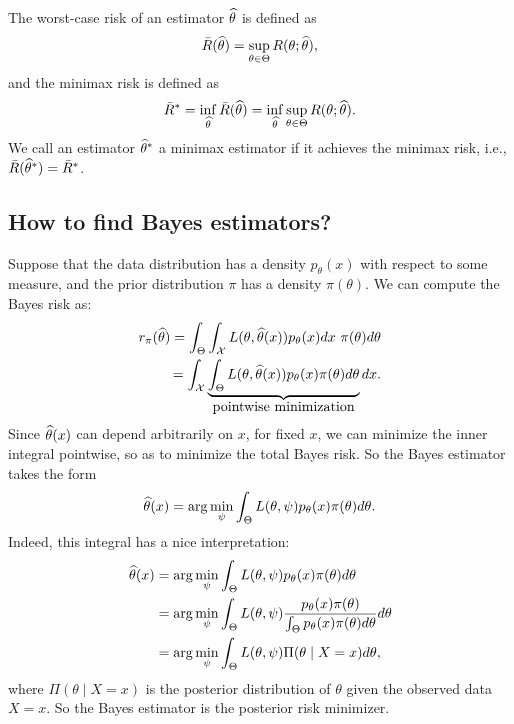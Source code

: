\documentclass[11pt,letterpaper]{article}
\numberwithin{assumption}{lecture}
\numberwithin{theorem}{lecture}
\numberwithin{proposition}{lecture}
\numberwithin{lemma}{lecture}
\numberwithin{claim}{lecture}
\numberwithin{corollary}{lecture}
\numberwithin{definition}{lecture}
\numberwithin{conjecture}{lecture}
\numberwithin{remark}{lecture}
\numberwithin{example}{lecture}
\numberwithin{equation}{lecture}
\begin{document}
\begin{definition}
  The worst-case risk of an estimator $\widehat{\theta}$ is defined as
  \begin{align*}
    \bar{R} (\widehat{\theta}) = \sup_{\theta \in \Theta} R(\theta; \widehat{\theta}),
  \end{align*}
  and the minimax risk is defined as
  \begin{align*}
    \bar{R}^* = \inf_{\widehat{\theta}} \bar{R} (\widehat{\theta}) = \inf_{\widehat{\theta}} \sup_{\theta \in \Theta} R(\theta; \widehat{\theta}).
  \end{align*}
  We call an estimator $\widehat{\theta}^*$ a minimax estimator if it achieves the minimax risk, i.e., $\bar{R} (\widehat{\theta}^*) = \bar{R}^*$.
\end{definition}

\subsection{How to find Bayes estimators?}
Suppose that the data distribution has a density $p_\theta (x)$ with respect to some measure, and the prior distribution $\pi$ has a density $\pi (\theta)$. We can compute the Bayes risk as:
\begin{align*}
  r_\pi (\widehat{\theta}) = \int_\Theta \int_{\mathcal{X}} L (\theta, \widehat{\theta} (x)) p_\theta (x) dx ~\pi (\theta) d \theta \\
  = \int_{\mathcal{X}} \underbrace{\int_\Theta L (\theta, \widehat{\theta} (x)) p_\theta (x) \pi (\theta) d\theta}_{\mbox{pointwise minimization}} dx.
\end{align*}
Since $\widehat{\theta} (x)$ can depend arbitrarily on $x$, for fixed $x$, we can minimize the inner integral pointwise, so as to minimize the total Bayes risk. So the Bayes estimator takes the form
\begin{align*}
  \widehat{\theta} (x) = \arg\min_{\psi} \int_\Theta L (\theta, \psi) p_\theta (x) \pi (\theta) d\theta.
\end{align*}
Indeed, this integral has a nice interpretation:
\begin{align*}
  \widehat{\theta} (x) &= \arg\min_{\psi} \int_\Theta L (\theta, \psi) p_\theta (x) \pi (\theta) d\theta\\
  &=  \arg\min_{\psi} \int_\Theta L (\theta, \psi)  \frac{p_\theta (x) \pi (\theta)
  }{\int_\Theta p_\theta (x) \pi (\theta) d\theta} d\theta\\
  &= \arg\min_{\psi} \int_\Theta L (\theta, \psi) \Pi (\theta \mid X =x )d \theta,
\end{align*}
where $\Pi (\theta \mid X = x)$ is the posterior distribution of $\theta$ given the observed data $X = x$. So the Bayes estimator is the posterior risk minimizer.
\end{document}
